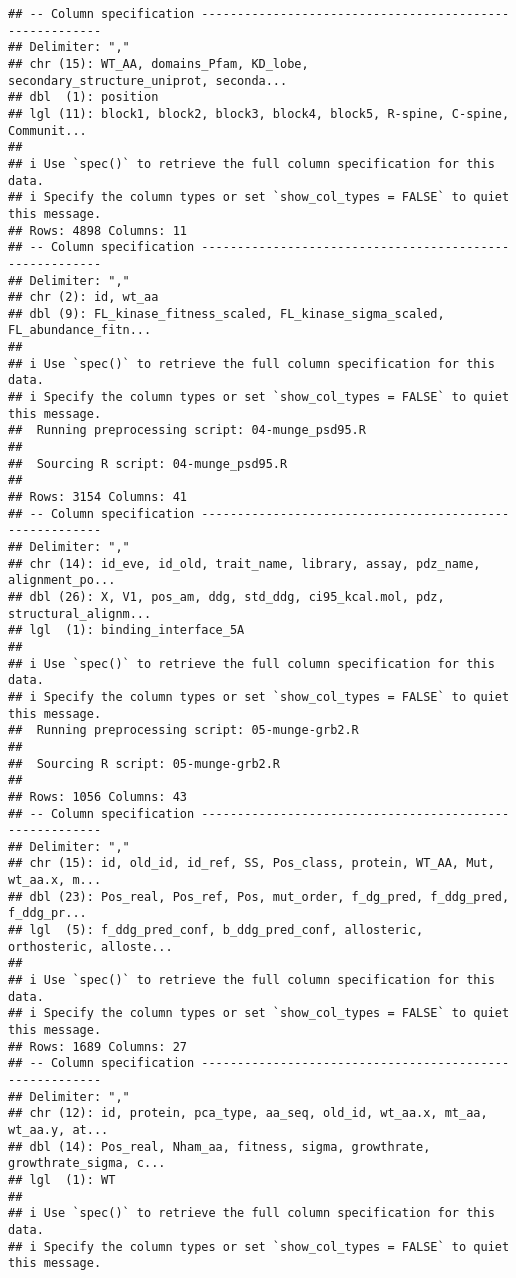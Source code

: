 \documentclass[
]{article}
\begin{document}
\begin{verbatim}
## -- Column specification --------------------------------------------------------
## Delimiter: ","
## chr (15): WT_AA, domains_Pfam, KD_lobe, secondary_structure_uniprot, seconda...
## dbl  (1): position
## lgl (11): block1, block2, block3, block4, block5, R-spine, C-spine, Communit...
## 
## i Use `spec()` to retrieve the full column specification for this data.
## i Specify the column types or set `show_col_types = FALSE` to quiet this message.
## Rows: 4898 Columns: 11
## -- Column specification --------------------------------------------------------
## Delimiter: ","
## chr (2): id, wt_aa
## dbl (9): FL_kinase_fitness_scaled, FL_kinase_sigma_scaled, FL_abundance_fitn...
## 
## i Use `spec()` to retrieve the full column specification for this data.
## i Specify the column types or set `show_col_types = FALSE` to quiet this message.
##  Running preprocessing script: 04-munge_psd95.R
## 
##  Sourcing R script: 04-munge_psd95.R
## 
## Rows: 3154 Columns: 41
## -- Column specification --------------------------------------------------------
## Delimiter: ","
## chr (14): id_eve, id_old, trait_name, library, assay, pdz_name, alignment_po...
## dbl (26): X, V1, pos_am, ddg, std_ddg, ci95_kcal.mol, pdz, structural_alignm...
## lgl  (1): binding_interface_5A
## 
## i Use `spec()` to retrieve the full column specification for this data.
## i Specify the column types or set `show_col_types = FALSE` to quiet this message.
##  Running preprocessing script: 05-munge-grb2.R
## 
##  Sourcing R script: 05-munge-grb2.R
## 
## Rows: 1056 Columns: 43
## -- Column specification --------------------------------------------------------
## Delimiter: ","
## chr (15): id, old_id, id_ref, SS, Pos_class, protein, WT_AA, Mut, wt_aa.x, m...
## dbl (23): Pos_real, Pos_ref, Pos, mut_order, f_dg_pred, f_ddg_pred, f_ddg_pr...
## lgl  (5): f_ddg_pred_conf, b_ddg_pred_conf, allosteric, orthosteric, alloste...
## 
## i Use `spec()` to retrieve the full column specification for this data.
## i Specify the column types or set `show_col_types = FALSE` to quiet this message.
## Rows: 1689 Columns: 27
## -- Column specification --------------------------------------------------------
## Delimiter: ","
## chr (12): id, protein, pca_type, aa_seq, old_id, wt_aa.x, mt_aa, wt_aa.y, at...
## dbl (14): Pos_real, Nham_aa, fitness, sigma, growthrate, growthrate_sigma, c...
## lgl  (1): WT
## 
## i Use `spec()` to retrieve the full column specification for this data.
## i Specify the column types or set `show_col_types = FALSE` to quiet this message.
\end{verbatim}
\end{document}
